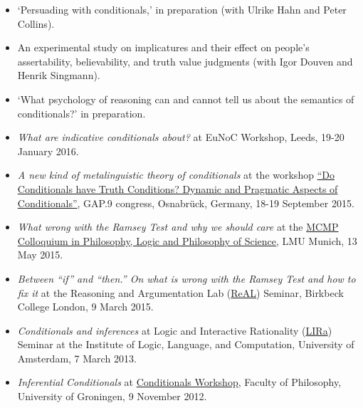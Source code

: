 \documentclass[a4paper,12pt]{article}
\begin{document}
\begin{small}
\begin{itemize}
   \item `Persuading with conditionals,' in preparation (with Ulrike Hahn and Peter Collins).
   \item An experimental study on implicatures and their effect on people's assertability, believability, and truth value judgments (with Igor Douven and Henrik Singmann).
   \item `What psychology of reasoning can and cannot tell us about the semantics of conditionals?' in preparation.  
  \end{itemize}
  

  \begin{itemize} 

    \item \emph{What are indicative conditionals about?} at EuNoC Workshop, Leeds, 19-20 January 2016.

    \item \emph{A new kind of metalinguistic theory of conditionals} at the workshop \href{http://cms.uni-konstanz.de/what-if/events/workshop-in-osnabrueck-september-2015-p1-and-p7/}{``Do Conditionals have Truth Conditions? Dynamic and Pragmatic Aspects of Conditionals''}, GAP.9 congress, Osnabrück, Germany, 18-19 September 2015.

    \item \emph{What wrong with the Ramsey Test and why we should care} at the \href{http://www.mcmp.philosophie.uni-muenchen.de/events/weekly_talks_new/index.html}{MCMP Colloquium in Philosophy, Logic and Philosophy of Science}, LMU Munich, 13 May 2015.

    \item \emph{Between ``if'' and ``then.'' On what is wrong with the Ramsey Test and how to fix it} at the Reasoning and Argumentation Lab (\href{http://www.bbk.ac.uk/psychology/ral}{ReAL}) Seminar, Birkbeck College London, 9 March 2015.

    \item \emph{Conditionals and inferences} at Logic and Interactive
    Rationality (\href{http://www.illc.uva.nl/lgc/seminar/}{LIRa})
    Seminar at the Institute of Logic, Language, and Computation,
    University of Amsterdam, 7 March 2013.
  
    \item \emph{Inferential Conditionals} at
    \href{https://sites.google.com/site/jannekehuitink/workshop}{Conditionals Workshop}, Faculty of Philosophy, University of Groningen, 9 November 2012.
  \end{itemize}
  

\end{small}
\end{document}
